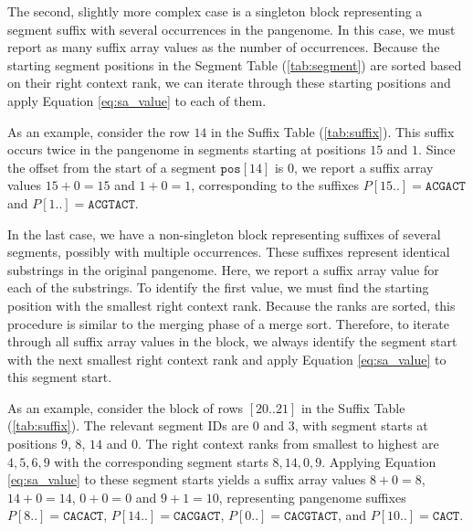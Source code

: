 The second, slightly more complex case is a singleton block representing a segment suffix with several occurrences in the pangenome.
In this case, we must report as many suffix array values as the number of occurrences.
Because the starting segment positions in the Segment Table (\ref{tab:segment}) are sorted based on their right context rank, we can iterate through these starting positions and apply Equation \ref{eq:sa_value} to each of them.

As an example, consider the row $14$ in the Suffix Table (\ref{tab:suffix}).
This suffix occurs twice in the pangenome in segments starting at positions $15$ and $1$.
Since the offset from the start of a segment $\texttt{pos}[14]$ is $0$, we report a suffix array values $15 + 0 = 15$ and $1 + 0 = 1$, corresponding to the suffixes $P[15..] = \texttt{ACGACT}$ and $P[1..] = \texttt{ACGTACT}$.

In the last case, we have a non-singleton block representing suffixes of several segments, possibly with multiple occurrences.
These suffixes represent identical substrings in the original pangenome.
Here, we report a suffix array value for each of the substrings.
To identify the first value, we must find the starting position with the smallest right context rank.
Because the ranks are sorted, this procedure is similar to the merging phase of a merge sort.
Therefore, to iterate through all suffix array values in the block, we always identify the segment start with the next smallest right context rank and apply Equation \ref{eq:sa_value} to this segment start.

As an example, consider the block of rows $[20..21]$ in the Suffix Table (\ref{tab:suffix}).
The relevant segment IDs are $0$ and $3$, with segment starts at positions $9$, $8$, $14$ and $0$.
The right context ranks from smallest to highest are $4, 5, 6, 9$ with the corresponding segment starts $8, 14, 0, 9$.
Applying Equation \ref{eq:sa_value} to these segment starts yields a suffix array values $8 + 0 = 8$, $14 + 0 = 14$, $0 + 0 = 0$ and $9 + 1 = 10$, representing pangenome suffixes $P[8..] = \texttt{CACACT}$, $P[14..] = \texttt{CACGACT}$, $P[0..] = \texttt{CACGTACT}$, and $P[10..] = \texttt{CACT}$.

